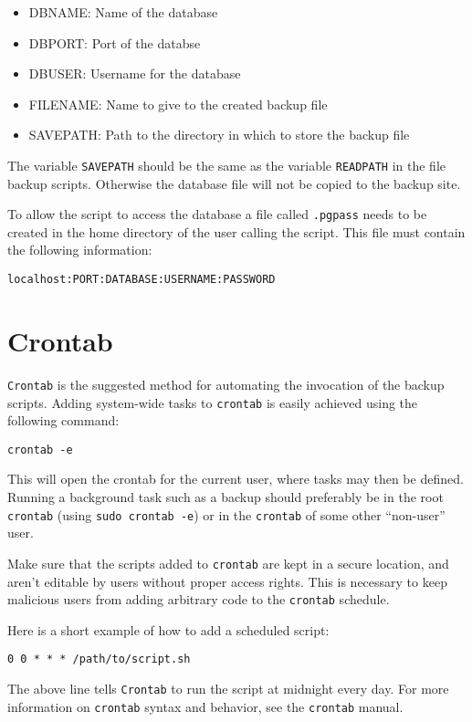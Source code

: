 \begin{itemize}
\item DBNAME: Name of the database
\item DBPORT: Port of the databse
\item DBUSER: Username for the database
\item FILENAME: Name to give to the created backup file
\item SAVEPATH: Path to the directory in which to store the backup file
\end{itemize}

The variable \texttt{SAVEPATH} should be the same as the variable
\texttt{READPATH} in the file backup scripts. Otherwise the database
file will not be copied to the backup site.

To allow the script to access the database a file called \texttt{.pgpass}
needs to be created in the home directory of the user calling the script.
This file must contain the following information:

\begin{verbatim}
localhost:PORT:DATABASE:USERNAME:PASSWORD
\end{verbatim}

\section{Crontab}

\texttt{Crontab} is the suggested method for automating the invocation
of the backup scripts. Adding system-wide tasks to \texttt{crontab} is
easily achieved using the following command:

\begin{verbatim}
crontab -e
\end{verbatim}

This will open the crontab for the current user, where tasks may then
be defined. Running a background task such as a backup should preferably
be in the root \texttt{crontab} (using \texttt{sudo crontab -e})
or in the \texttt{crontab} of some other ``non-user'' user.

Make sure that the scripts added to \texttt{crontab} are kept in a
secure location, and aren't editable by users without proper access
rights. This is necessary to keep malicious users from adding
arbitrary code to the \texttt{crontab} schedule.
 
Here is a short example of how to add a scheduled script:
\begin{verbatim}
0 0 * * * /path/to/script.sh
\end{verbatim}
The above line tells \texttt{Crontab} to run the script at midnight
every day. For more information on \texttt{crontab} syntax and
behavior, see the \texttt{crontab} manual.

